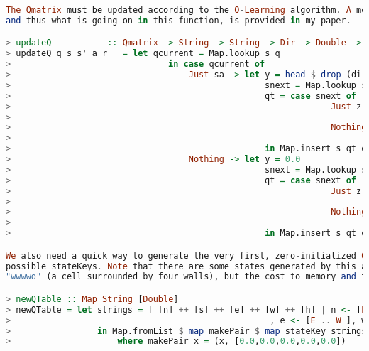 \documentclass[12pt,a4paper]{article}
\begin{document}
\begin{lstlisting}[language=Haskell,numbers=none,basicstyle=\tiny]
The Qmatrix must be updated according to the Q-Learning algorithm. A more detailed explanation of this algorithm,
and thus what is going on in this function, is provided in my paper. 

> updateQ           :: Qmatrix -> String -> String -> Dir -> Double -> Qmatrix
> updateQ q s s' a r   = let qcurrent = Map.lookup s q
>                               in case qcurrent of
>                                   Just sa -> let y = head $ drop (dirIndex a) sa
>                                                  snext = Map.lookup s' q
>                                                  qt = case snext of
>                                                               Just z -> let newval = y + (eta * (r + (gamma * (maximum z)) - y))
>                                                                           in take (dirIndex a) sa ++ [newval] ++ drop ((dirIndex a) + 1) sa
>                                                               Nothing -> let newval = y + (eta * (r - y))
>                                                                           in take (dirIndex a) sa ++ [newval] ++ drop ((dirIndex a) + 1) sa
>                                                  in Map.insert s qt q
>                                   Nothing -> let y = 0.0
>                                                  snext = Map.lookup s' q
>                                                  qt = case snext of
>                                                               Just z -> let newval = y + (eta * (r + (gamma * (maximum z)) - y))
>                                                                           in replicate (dirIndex a) 0.0 ++ [newval] ++ (drop ((dirIndex a) + 1) $ replicate 5 0.0)
>                                                               Nothing -> let newval = eta * r
>                                                                           in replicate (dirIndex a) 0.0 ++ [newval] ++ (drop ((dirIndex a) + 1) $ replicate 5 0.0)
>                                                  in Map.insert s qt q

We also need a quick way to generate the very first, zero-initialized Qmatrix, based on combinations over the
possible stateKeys. Note that there are some states generated by this algorithm that will never occur, such as
"wwwwo" (a cell surrounded by four walls), but the cost to memory and time is minimal, so we don't really care.

> newQTable :: Map String [Double]
> newQTable = let strings = [ [n] ++ [s] ++ [e] ++ [w] ++ [h] | n <- [E .. W], s <- [E .. W]
>                                                   , e <- [E .. W ], w <- [E .. W], h <- [Rc .. Re]]
>                 in Map.fromList $ map makePair $ map stateKey strings
>                     where makePair x = (x, [0.0,0.0,0.0,0.0,0.0])


\end{lstlisting}
\end{document}
